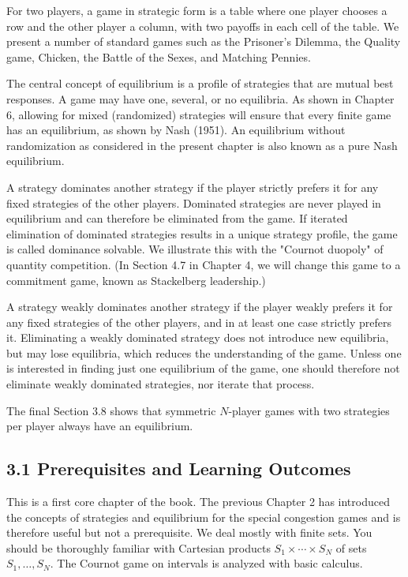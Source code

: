 \documentclass[12pt]{article}
\begin{document}
For two players, a game in strategic form is a table where one player chooses a row and the other player a column, with two payoffs in each cell of the table. We present a number of standard games such as the Prisoner's Dilemma, the Quality game, Chicken, the Battle of the Sexes, and Matching Pennies.

The central concept of equilibrium is a profile of strategies that are mutual best responses. A game may have one, several, or no equilibria. As shown in Chapter 6, allowing for mixed (randomized) strategies will ensure that every finite game has an equilibrium, as shown by Nash (1951). An equilibrium without randomization as considered in the present chapter is also known as a pure Nash equilibrium.

A strategy dominates another strategy if the player strictly prefers it for any fixed strategies of the other players. Dominated strategies are never played in equilibrium and can therefore be eliminated from the game. If iterated elimination of dominated strategies results in a unique strategy profile, the game is called dominance solvable. We illustrate this with the "Cournot duopoly" of quantity competition. (In Section 4.7 in Chapter 4, we will change this game to a commitment game, known as Stackelberg leadership.)

A strategy weakly dominates another strategy if the player weakly prefers it for any fixed strategies of the other players, and in at least one case strictly prefers it. Eliminating a weakly dominated strategy does not introduce new equilibria, but may lose equilibria, which reduces the understanding of the game. Unless one is interested in finding just one equilibrium of the game, one should therefore not eliminate weakly dominated strategies, nor iterate that process.

The final Section 3.8 shows that symmetric $N$-player games with two strategies per player always have an equilibrium.

\subsection*{3.1 Prerequisites and Learning Outcomes}
This is a first core chapter of the book. The previous Chapter 2 has introduced the concepts of strategies and equilibrium for the special congestion games and is therefore useful but not a prerequisite. We deal mostly with finite sets. You should be thoroughly familiar with Cartesian products $S_{1} \times \cdots \times S_{N}$ of sets $S_{1}, \ldots, S_{N}$. The Cournot game on intervals is analyzed with basic calculus.
\end{document}

